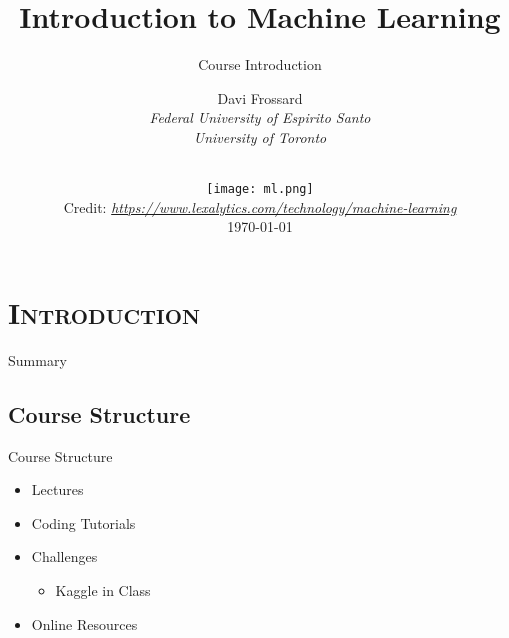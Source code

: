 





\section{\scshape Introduction}
\begin{frame}
\title{Introduction to Machine Learning}
\subtitle{Course Introduction}
\author{
	Davi Frossard\\
	{\it Federal University of Espirito Santo \\ University of Toronto}\\
}
\date{
    \vspace{-3.5em}\\
    \texttt{[image: ml.png]}\\[-1ex]
    {\tiny Credit: {\itshape \url{https://www.lexalytics.com/technology/machine-learning}}}
    \\
	\today
}
\titlepage
\end{frame}

\begin{frame}{Summary}
\tableofcontents
\end{frame}

\subsection{Course Structure}
\begin{frame}{Course Structure}
\begin{itemize}
\item Lectures
\item Coding Tutorials
\item Challenges
\begin{itemize}
\item Kaggle in Class
\end{itemize}
\item Online Resources
\end{itemize}
\end{frame}

